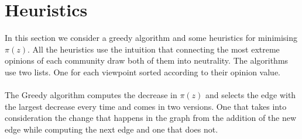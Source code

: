 \section{Heuristics}
\label{sec:heuristics}

In this section we  consider a greedy algorithm and some heuristics for minimising $\pi(z)$. All the heuristics use the intuition that connecting the most extreme opinions of each community draw both of them into neutrality. The algorithms use two lists. One for each viewpoint sorted according to their opinion value. 
\\
\\
The Greedy algorithm computes the decrease in $\pi(z)$ and selects the edge with the largest decrease every time and comes in two versions. One that takes into consideration the change that happens in the graph from the addition of the new edge while computing the next edge and one that does not.
\\

\clearpage

